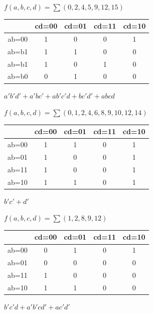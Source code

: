 \documentclass[a4paper,12pt]{article}
\begin{document}
\begin{question}
\begin{subquestion}
\(f(a,b,c,d)=\sum{(0,2,4,5,9,12,15)}\)\\[0pt]
\begin{answer}
\begin{tabular}{ c|c|c|c|c }
  & cd=00 & cd=01 & cd=11 & cd=10\\
  \hline
  ab=00 & 1 & 0 & 0 & 1\\
  ab=b1 & 1 & 1 & 0 & 0\\
  ab=b1 & 1 & 0 & 1 & 0\\
  ab=b0 & 0 & 1 & 0 & 0
\end{tabular}
\(a'b'd' + a'bc' + ab'c'd + bc'd' + abcd\)\\[0pt]
\end{answer}
\end{subquestion}

\begin{subquestion}
\(f(a,b,c,d)=\sum{(0,1,2,4,6,8,9,10,12,14)}\)\\[0pt]
\begin{answer}
\begin{tabular}{ c|c|c|c|c }
  & cd=00 & cd=01 & cd=11 & cd=10\\
  \hline
  ab=00 & 1 & 1 & 0 & 1\\
  ab=01 & 1 & 0 & 0 & 1\\
  ab=11 & 1 & 0 & 0 & 1\\
  ab=10 & 1 & 1 & 0 & 1
\end{tabular}
\(b'c' + d'\)\\[0pt]
\end{answer}
\end{subquestion}

\begin{subquestion}
\(f(a,b,c,d)=\sum{(1,2,8,9,12)}\)\\[0pt]
\begin{answer}
\begin{tabular}{ c|c|c|c|c }
  & cd=00 & cd=01 & cd=11 & cd=10\\
  \hline
  ab=00 & 0 & 1 & 0 & 1\\
  ab=01 & 0 & 0 & 0 & 0\\
  ab=11 & 1 & 0 & 0 & 0\\
  ab=10 & 1 & 1 & 0 & 0
\end{tabular}
\(b'c'd + a'b'cd' + ac'd'\)\\[0pt]
\end{answer}
\end{subquestion}
\end{question}
\end{document}
